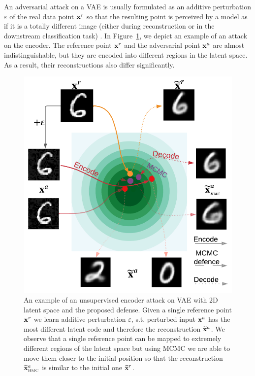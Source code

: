 An adversarial attack on a VAE is usually formulated as an additive perturbation $\varepsilon$ of the real data point ${\mathbf{x}}^r$ so that the resulting point is perceived by a model as if it is a totally different image (either during reconstruction or in the downstream classification task) \citep{Gondim-Ribeiro2018-cu}. In Figure~\ref{fig:toy_exaple}, we depict an example of an attack on the encoder. The reference point ${\mathbf{x}}^r$ and the adversarial point ${\mathbf{x}}^a$ are almost indistinguishable, but they are encoded into different regions in the latent space. As a result, their reconstructions also differ significantly.

\begin{figure}[t]
	\begin{center}
		\includegraphics[width=0.6\linewidth]{pics/3_adv_att/Figure_1_upd.pdf}
		\caption{An example of an unsupervised encoder attack on VAE with 2D latent space and the proposed defense. 
			Given a single reference point ${\mathbf{x}}^r$ we learn additive perturbation $\varepsilon$, s.t. perturbed input ${\mathbf{x}}^a$ has the most different latent code and therefore the reconstruction $\widetilde{{\mathbf{x}}}^a$. 
			We observe that a single reference point can be mapped to extremely different regions of the latent space but using MCMC we are able to move them closer to the initial position so that the reconstruction $\widetilde{\rvx}^a_{\text{\tiny{HMC}}}$ is similar to the initial one $\widetilde{{\mathbf{x}}}^r$.}
		\label{fig:toy_exaple}
	\end{center}
    \vspace{\baselineskip}
\end{figure}

